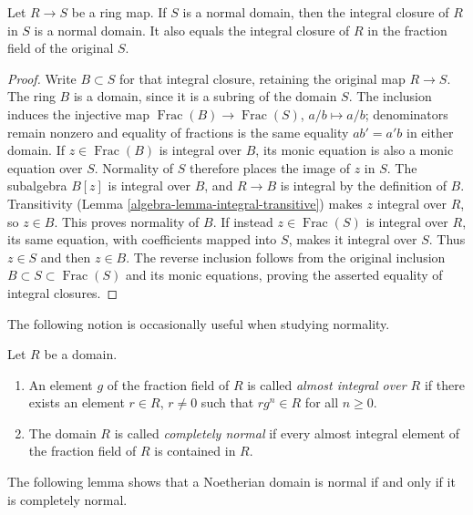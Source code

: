 \begin{lemma}
\label{editorial-source-lemma-integral-closure-in-normal}
Let $R \to S$ be a ring map.
If $S$ is a normal domain, then the integral closure of $R$
in $S$ is a normal domain. It also equals the integral closure
of $R$ in the fraction field of the original $S$.
\end{lemma}

\begin{proof}
Write $B\subset S$ for that integral closure, retaining the
original map $R\to S$. The ring $B$ is a domain, since it is
a subring of the domain $S$. The inclusion induces the injective
map $\operatorname{Frac}(B)\to\operatorname{Frac}(S)$,
$a/b\mapsto a/b$; denominators remain nonzero and equality of
fractions is the same equality $ab'=a'b$ in either domain.
If $z\in\operatorname{Frac}(B)$ is integral over $B$, its monic
equation is also a monic equation over $S$. Normality of $S$
therefore places the image of $z$ in $S$. The subalgebra $B[z]$
is integral over $B$, and $R\to B$ is integral by the definition
of $B$. Transitivity (Lemma \ref{algebra-lemma-integral-transitive}) makes
$z$ integral over $R$, so $z\in B$. This proves normality of $B$.
If instead $z\in\operatorname{Frac}(S)$ is integral over $R$,
its same equation, with coefficients mapped into $S$, makes it
integral over $S$. Thus $z\in S$ and then $z\in B$.
The reverse inclusion follows from the original inclusion
$B\subset S\subset\operatorname{Frac}(S)$ and its monic equations,
proving the asserted equality of integral closures.
\end{proof}

\noindent
The following notion is occasionally useful when
studying normality.

\begin{definition}
\label{editorial-source-definition-almost-integral}
Let $R$ be a domain.
\begin{enumerate}
\item An element $g$ of the fraction
field of $R$ is called {\it almost integral over $R$}
if there exists an element $r \in R$, $r\not = 0$
such that $rg^n \in R$ for all $n \geq 0$.
\item The domain $R$ is called {\it completely normal} if every
almost integral element of the fraction field of $R$ is
contained in $R$.
\end{enumerate}
\end{definition}

\noindent
The following lemma shows that a Noetherian domain is normal
if and only if it is completely normal.

